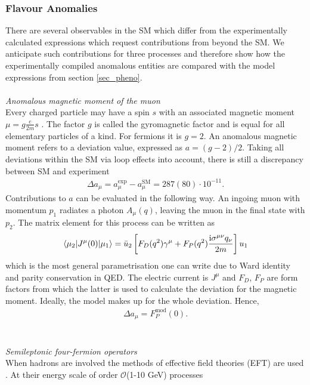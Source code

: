 \subsubsection{Flavour Anomalies}
\label{sec_flAnom}
There are several observables in the SM which differ from the experimentally calculated expressions which request contributions from beyond the 
SM. We anticipate such contributions for three processes and therefore show how the experimentally compiled anomalous entities are compared with
the model expressions from section \ref{sec_pheno}.
\\ \\\textit{Anomalous magnetic moment of the muon}\\
\noindent
Every charged particle
may have a spin $s$ with an associated magnetic moment $ \mu = g \frac{e}{2m}s$ \cite{anomMom}.
The factor $g$ is called the gyromagnetic factor and is equal for all elementary particles of a kind. For fermions it is $g=2$. An anomalous
magnetic moment refers to a deviation value, expressed as $a=(g-2)/2$. Taking all deviations within the SM via loop effects into account, there
is still a discrepancy between SM and experiment 
\begin{align}
 \Delta a_\mu = a_\mu^\text{exp} - a_\mu^\text{SM} = 287(80)\cdot 10^{-11}.
\end{align}
Contributions to $a$ can be evaluated in the following way. An ingoing muon with momentum $p_1$ radiates a photon $A_\mu (q)$, leaving the muon in the final 
state with $p_2$. The matrix element for this process can be written as
\begin{align}
 \langle \mu_2|J^\mu(0)|\mu_1\rangle = \bar u_2 \left[F_D(q^2)\gamma^\mu + F_P(q^2)\frac{\text{i} \sigma^{\mu\nu}q_\nu}{2m}\right] u_1
 \label{eq_gordon}
\end{align}
which is the most general parametrisation one can write due to Ward identity and parity conservation in QED. The electric current is $J^\mu$ 
and $F_D$, $F_P$ are form factors from which the latter is used to calculate the deviation for the magnetic moment. Ideally, the model makes up
for the whole deviation. Hence,
\begin{align}
 \Delta a_\mu = F_P^\text{mod}(0).
\end{align}
\\ \\ \textit{Semileptonic four-fermion operators}\\
When hadrons are involved the methods of effective field theories (EFT) are used \cite{BurasEFT}. At their energy scale of order $\mathcal{O}$(1-10 GeV) processes

